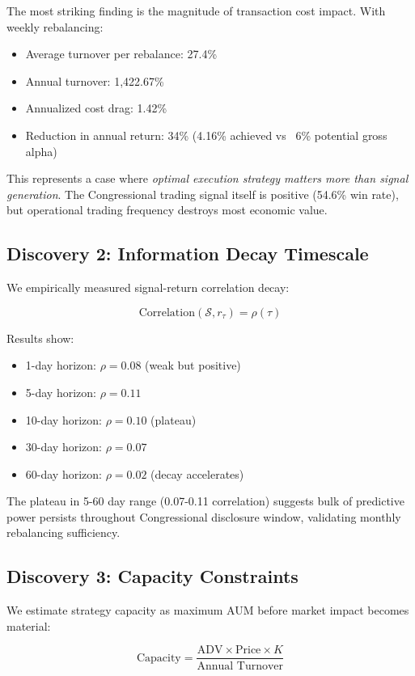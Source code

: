 \documentclass[twocolumn,ieee]{Base_Latex_Template/arithmaxresearch}
\begin{document}
The most striking finding is the magnitude of transaction cost impact. With weekly rebalancing:

\begin{itemize}
\item Average turnover per rebalance: 27.4\%
\item Annual turnover: 1,422.67\%
\item Annualized cost drag: 1.42\%
\item Reduction in annual return: 34\% (4.16\% achieved vs ~6\% potential gross alpha)
\end{itemize}

This represents a case where \textit{optimal execution strategy matters more than signal generation}. The Congressional trading signal itself is positive (54.6\% win rate), but operational trading frequency destroys most economic value.

\subsection{Discovery 2: Information Decay Timescale}

We empirically measured signal-return correlation decay:

$$\text{Correlation}(\mathcal{S}, r_{\tau}) = \rho(\tau)$$

Results show:
\begin{itemize}
\item 1-day horizon: $\rho = 0.08$ (weak but positive)
\item 5-day horizon: $\rho = 0.11$
\item 10-day horizon: $\rho = 0.10$ (plateau)
\item 30-day horizon: $\rho = 0.07$
\item 60-day horizon: $\rho = 0.02$ (decay accelerates)
\end{itemize}

The plateau in 5-60 day range (0.07-0.11 correlation) suggests bulk of predictive power persists throughout Congressional disclosure window, validating monthly rebalancing sufficiency.

\subsection{Discovery 3: Capacity Constraints}

We estimate strategy capacity as maximum AUM before market impact becomes material:

$$\text{Capacity} = \frac{\text{ADV} \times \text{Price} \times K}{\text{Annual Turnover}}$$
\end{document}
